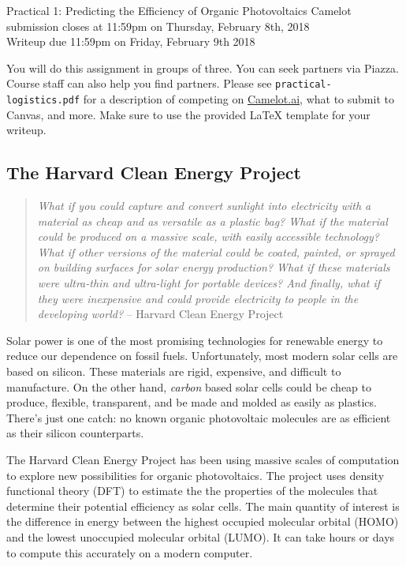 \documentclass[12pt]{article}
\begin{document}
  \begin{center}
		{\Large Practical 1: Predicting the Efficiency of Organic Photovoltaics}
		Camelot submission closes at 11:59pm on Thursday, February 8th, 2018\\
		Writeup due 11:59pm on Friday, February 9th 2018 
	\end{center}

	\bigskip
	
	\noindent You will do this assignment in groups of three. You can seek partners via Piazza. Course staff can also help you find partners. Please see \texttt{practical-logistics.pdf} for a description
    of competing on \href{https://portal.camelot.ai}{Camelot.ai}, what to submit to Canvas, and more. Make sure to use the provided \LaTeX \hspace{1pt} template for your writeup.
	
	
	\subsection*{The Harvard Clean Energy Project}
	
	\begin{quote}
		\emph{What if you could capture and convert sunlight into electricity with a material as cheap and as versatile as a plastic bag? What if the material could be produced on a massive scale, with easily accessible technology? What if other versions of the material could be coated, painted, or sprayed on building surfaces for solar energy production? What if these materials were ultra-thin and ultra-light for portable devices? And finally, what if they were inexpensive and could provide electricity to people in the developing world?} -- Harvard Clean Energy Project
	\end{quote}
	
	Solar power is one of the most promising technologies for renewable energy to reduce our dependence on fossil fuels.  Unfortunately, most modern solar cells are based on silicon.  These materials are rigid, expensive, and difficult to manufacture.  On the other hand, \emph{carbon} based solar cells could be cheap to produce, flexible, transparent, and be made and molded as easily as plastics.  There's just one catch: no known organic photovoltaic molecules are as efficient as their silicon counterparts.
	
	The Harvard Clean Energy Project has been using massive scales of computation to explore new possibilities for organic photovoltaics.  The project uses density functional theory (DFT) to estimate the the properties of the molecules that determine their potential efficiency as solar cells.  The main quantity of interest is the difference in energy between the highest occupied molecular orbital (HOMO) and the lowest unoccupied molecular orbital (LUMO).  It can take hours or days to compute this accurately on a modern computer.
	
\end{document}
